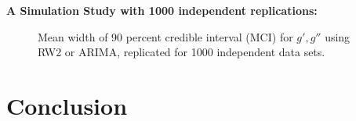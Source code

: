 \documentclass{beamer} %
\begin{document}
\begin{frame}
\textbf{A Simulation Study with 1000 independent replications:}

\begin{figure}[p]
    \centering
    \caption{Mean width of 90 percent credible interval (MCI) for $g',g''$ using RW2 or ARIMA, replicated for 1000 independent data sets.}
    \label{fig:sim1-1000replic}
\end{figure}
\end{frame}




\section{Conclusion}
\end{document}
